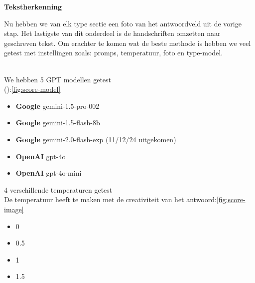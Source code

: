 \documentclass[12pt]{article}
\begin{document}
\noindent
\textbf{Tekstherkenning}
\begin{multicols}{2}
Nu hebben we van elk type sectie een foto van het antwoordveld uit de vorige stap. Het lastigste van dit onderdeel is de handschriften omzetten naar geschreven tekst. Om erachter te komen wat de beste methode is hebben we veel getest met instellingen zoals: promps, temperatuur, foto en type-model.\\
\\
\begin{minipage}{\textwidth}
We hebben 5 GPT modellen getest\\ (\cite{geminiproManual, openaiManual}):\ref{fig:score-model}
\begin{itemize}
    \item \textbf{Google} gemini-1.5-pro-002
    \item \textbf{Google} gemini-1.5-flash-8b
    \item \textbf{Google} gemini-2.0-flash-exp \newline (11/12/24 uitgekomen)
    \item \textbf{OpenAI} gpt-4o
    \item \textbf{OpenAI} gpt-4o-mini
\end{itemize}
\end{minipage}

\noindent\begin{minipage}{\textwidth}
4 verschillende temperaturen getest \\
De temperatuur heeft te maken met de creativiteit van het antwoord:\ref{fig:score-image}
\begin{itemize}
    \item 0
    \item 0.5
    \item 1
    \item 1.5
\end{itemize}
\end{minipage}
\end{multicols}
\pagebreak
\end{document}
